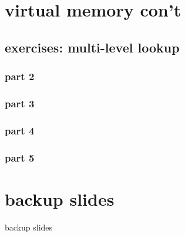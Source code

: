 \section{virtual memory con't}
\subsection{exercises: multi-level lookup}
\subsubsection{part 2}

\subsubsection{part 3}


\subsubsection{part 4}

\subsubsection{part 5}





\section{backup slides}
\begin{frame}{backup slides}
\end{frame}


